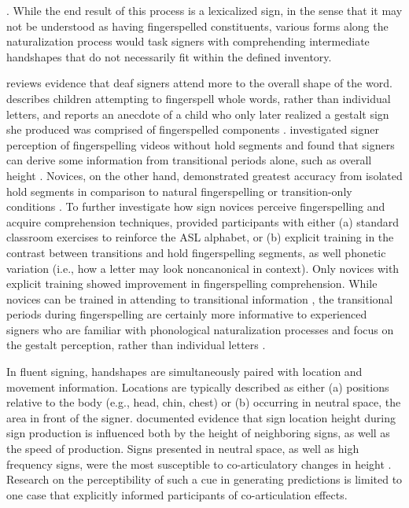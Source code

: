 \cite{cormier2008}. While the end result of this process is a lexicalized sign, in the sense that it may not be understood as having fingerspelled constituents, various forms along the naturalization process would task signers with comprehending intermediate handshapes that do not necessarily fit within the defined inventory. \par 
                 reviews evidence that deaf signers attend more to the overall shape of the word.  describes children attempting to fingerspell whole words, rather than individual letters, and reports an anecdote of a child who only later realized a gestalt sign she produced was comprised of fingerspelled components \cite<as cited in>[]{maxwell1988}.  investigated signer perception of fingerspelling videos without hold segments and found that signers can derive some information from transitional periods alone, such as overall height \cite<as cited by>[]{geer2017}. Novices, on the other hand, demonstrated greatest accuracy from isolated hold segments in comparison to natural fingerspelling or transition-only conditions \cite{geer2014}. To further investigate how sign novices perceive fingerspelling and acquire comprehension techniques,  provided participants with either (a) standard classroom exercises to reinforce the ASL alphabet, or (b) explicit training in the contrast between transitions and hold fingerspelling segments, as well phonetic variation (i.e., how a letter may look noncanonical in context). Only novices with explicit training showed improvement in fingerspelling comprehension. While novices can be trained in attending to transitional information \cite{geer2017},  the transitional periods during fingerspelling are certainly more informative to experienced signers who are familiar with phonological naturalization processes and focus on the gestalt perception, rather than individual letters \cite{wilcox1992}. \par
                In fluent signing, handshapes are simultaneously paired with location and movement information. Locations are typically described as either (a) positions relative to the body (e.g., head, chin, chest) or (b) occurring in neutral space, the area in front of the signer.  documented evidence that sign location height during sign production is influenced both by the height of neighboring signs, as well as the speed of production. Signs presented in neutral space, as well as high frequency signs, were the most susceptible to co-articulatory changes in height \cite{mauk2003, mauk2008}. Research on the perceptibility of such a cue in generating predictions is limited to one case that explicitly informed participants of co-articulation effects. \par
